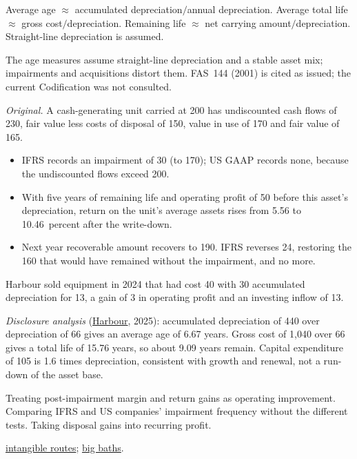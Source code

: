 \begin{qfmethod}
 Average age $\approx$ accumulated depreciation$/$annual depreciation. Average total life $\approx$ gross cost$/$depreciation. Remaining life $\approx$ net carrying amount$/$depreciation. Straight-line depreciation is assumed.

 The age measures assume straight-line depreciation and a stable asset mix; impairments and acquisitions distort them. FAS~144 (2001) is cited as issued; the current Codification was not consulted.

 \emph{Original.} A cash-generating unit carried at 200 has undiscounted cash flows of 230, fair value less costs of disposal of 150, value in use of 170 and fair value of 165.
\begin{itemize}
\item IFRS records an impairment of 30 (to 170); US GAAP records none, because the undiscounted flows exceed 200.
\item With five years of remaining life and operating profit of 50 before this asset's depreciation, return on the unit's average assets rises from 5.56 to 10.46~percent after the write-down.
\item Next year recoverable amount recovers to 190. IFRS reverses 24, restoring the 160 that would have remained without the impairment, and no more.
\end{itemize}
Harbour sold equipment in 2024 that had cost 40 with 30 accumulated depreciation for 13, a gain of 3 in operating profit and an investing inflow of 13.

\emph{Disclosure analysis} (\hyperref[ex:harbour-tools-statements]{Harbour}, 2025): accumulated depreciation of 440 over depreciation of 66 gives an average age of 6.67 years. Gross cost of 1{,}040 over 66 gives a total life of 15.76 years, so about 9.09 years remain. Capital expenditure of 105 is 1.6 times depreciation, consistent with growth and renewal, not a run-down of the asset base.

 Treating post-impairment margin and return gains as operating improvement. Comparing IFRS and US companies' impairment frequency without the different tests. Taking disposal gains into recurring profit.

 \hyperref[meth:intangible-acquisition-routes]{intangible routes}; \hyperref[meth:earnings-management-presentation]{big baths}.

\end{qfmethod}
